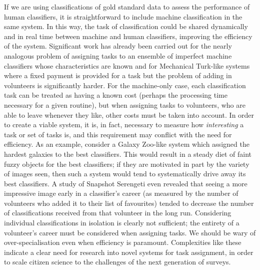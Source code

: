 \documentclass{ar2e}
\begin{document}
If we are using classifications of gold standard data to assess the performance
of human classifiers, it is straightforward to include machine classification in
the same system. In this way, the task of classification could be shared
dynamically and in real time between machine and human classifiers, improving
the efficiency of the system. Significant work has already been carried out for
the nearly analogous problem of assigning tasks to an ensemble of imperfect
machine classifiers whose characteristics are known 
and for
Mechanical Turk-like systems where a fixed payment is provided for a task but
the problem of adding in volunteers is significantly harder.
For the machine-only case, each classification task can be treated as having a
known cost (perhaps the processing time necessary for a given routine), but when
assigning tasks to  volunteers, who are able to leave whenever they like, other
costs must be taken into account. In order to create a viable system, it is, in
fact, necessary to measure how {\it interesting} 
a task or set of tasks is, and this
requirement may conflict with the need for efficiency. As an example, consider a
Galaxy Zoo-like system which assigned the hardest galaxies to the best
classifiers. This would result in a steady diet of faint fuzzy objects for the
best classifiers; if they are motivated in part by the variety of images seen,
then such a system would tend to systematically drive away its best classifiers.
A study of Snapshot Serengeti even revealed that seeing a more impressive image
early in a classifier's career (as measured by the number of volunteers who
added it to their list of favourites) tended to decrease the number of
classifications received from that volunteer in the long run. 
Considering
individual classifications in isolation is clearly not sufficient; the entirety
of a volunteer's career must be considered when assigning tasks. We should be
wary of over-specialisation even when efficiency is paramount. Complexities like
these indicate a clear need for research into novel systems for task assignment,
in order to scale citizen science to the challenges of the next generation of
surveys. 




\end{document}
